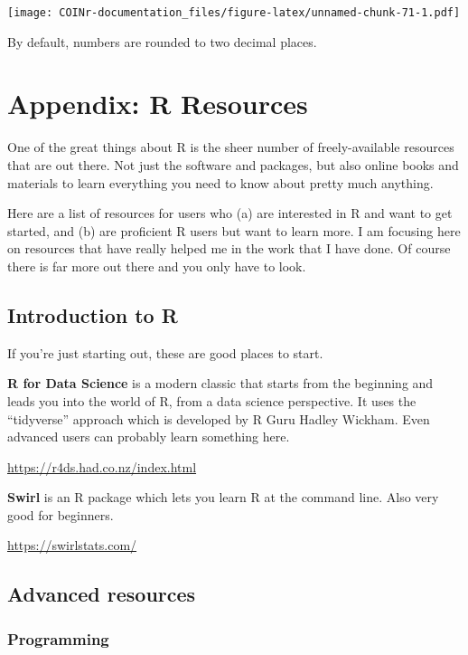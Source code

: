 \documentclass[
]{book}
\begin{document}
\texttt{[image: COINr-documentation\_files/figure-latex/unnamed-chunk-71-1.pdf]}

By default, numbers are rounded to two decimal places.

\hypertarget{appendix-r-resources}{%
\chapter{Appendix: R Resources}\label{appendix-r-resources}}

One of the great things about R is the sheer number of freely-available resources that are out there. Not just the software and packages, but also online books and materials to learn everything you need to know about pretty much anything.

Here are a list of resources for users who (a) are interested in R and want to get started, and (b) are proficient R users but want to learn more. I am focusing here on resources that have really helped me in the work that I have done. Of course there is far more out there and you only have to look.

\hypertarget{introduction-to-r}{%
\section{Introduction to R}\label{introduction-to-r}}

If you're just starting out, these are good places to start.

\textbf{R for Data Science} is a modern classic that starts from the beginning and leads you into the world of R, from a data science perspective. It uses the ``tidyverse'' approach which is developed by R Guru Hadley Wickham. Even advanced users can probably learn something here.

\url{https://r4ds.had.co.nz/index.html}

\textbf{Swirl} is an R package which lets you learn R at the command line. Also very good for beginners.

\url{https://swirlstats.com/}

\hypertarget{advanced-resources}{%
\section{Advanced resources}\label{advanced-resources}}

\hypertarget{programming}{%
\subsection{Programming}\label{programming}}
\end{document}

